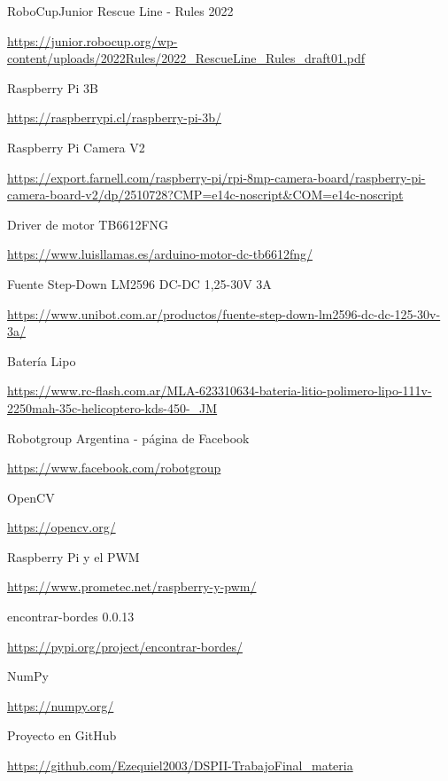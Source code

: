 \documentclass[11pt,a4paper]{article}
\begin{document}
	\newpage
	\begin{thebibliography}{}
		 RoboCupJunior Rescue Line - Rules 2022
		
		\href{https://junior.robocup.org/wp-content/uploads/2022Rules/2022_RescueLine_Rules_draft01.pdf}{https://junior.robocup.org/wp-content/uploads/2022Rules/2022\_RescueLine\_Rules\_draft01.pdf}
		
		 Raspberry Pi 3B
		
		\href{https://raspberrypi.cl/raspberry-pi-3b/}{https://raspberrypi.cl/raspberry-pi-3b/}
		
		 Raspberry Pi Camera V2
		
		\href{https://export.farnell.com/raspberry-pi/rpi-8mp-camera-board/raspberry-pi-camera-board-v2/dp/2510728?CMP=e14c-noscript&COM=e14c-noscript}{https://export.farnell.com/raspberry-pi/rpi-8mp-camera-board/raspberry-pi-camera-board-v2/dp/2510728?CMP=e14c-noscript\&COM=e14c-noscript}
		
		 Driver de motor TB6612FNG
		
		\href{https://www.luisllamas.es/arduino-motor-dc-tb6612fng/}{https://www.luisllamas.es/arduino-motor-dc-tb6612fng/}
		
		 Fuente Step-Down LM2596 DC-DC 1,25-30V 3A
		
		\href{https://www.unibot.com.ar/productos/fuente-step-down-lm2596-dc-dc-125-30v-3a/}{https://www.unibot.com.ar/productos/fuente-step-down-lm2596-dc-dc-125-30v-3a/}
		
		 Batería Lipo
		
		\href{https://www.rc-flash.com.ar/MLA-623310634-bateria-litio-polimero-lipo-111v-2250mah-35c-helicoptero-kds-450-_JM}{https://www.rc-flash.com.ar/MLA-623310634-bateria-litio-polimero-lipo-111v-2250mah-35c-helicoptero-kds-450-\_JM}
		
		 Robotgroup Argentina - página de Facebook
		
		\href{https://www.facebook.com/robotgroup}{https://www.facebook.com/robotgroup}
		
		 OpenCV
		
		\href{https://opencv.org/}{https://opencv.org/}
		
		 Raspberry Pi y el PWM
		
		\href{https://www.prometec.net/raspberry-y-pwm/}{https://www.prometec.net/raspberry-y-pwm/}
		
		 encontrar-bordes 0.0.13
		
		\href{https://pypi.org/project/encontrar-bordes/}{https://pypi.org/project/encontrar-bordes/}
		
		 NumPy
		
		\href{https://numpy.org/}{https://numpy.org/}
		
		 Proyecto en GitHub 
		
		\href{https://github.com/Ezequiel2003/DSPII-TrabajoFinal_materia}{https://github.com/Ezequiel2003/DSPII-TrabajoFinal\_materia}
		
	\end{thebibliography}
	
	
	
\end{document}
